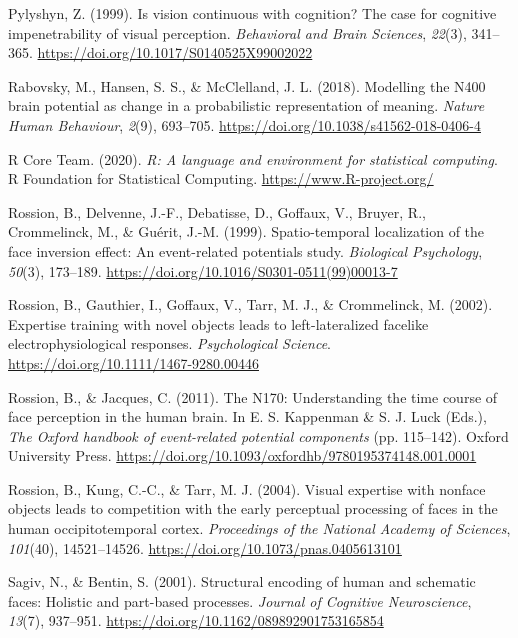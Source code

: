 \documentclass[
  english,
  man,floatsintext]{apa7}
\begin{document}
\leavevmode\hypertarget{ref-pylyshyn1999}{}%
Pylyshyn, Z. (1999). Is vision continuous with cognition? The case for cognitive impenetrability of visual perception. \emph{Behavioral and Brain Sciences}, \emph{22}(3), 341--365. \url{https://doi.org/10.1017/S0140525X99002022}

\leavevmode\hypertarget{ref-rabovsky2018}{}%
Rabovsky, M., Hansen, S. S., \& McClelland, J. L. (2018). Modelling the N400 brain potential as change in a probabilistic representation of meaning. \emph{Nature Human Behaviour}, \emph{2}(9), 693--705. \url{https://doi.org/10.1038/s41562-018-0406-4}

\leavevmode\hypertarget{ref-R-base}{}%
R Core Team. (2020). \emph{R: A language and environment for statistical computing}. R Foundation for Statistical Computing. \url{https://www.R-project.org/}

\leavevmode\hypertarget{ref-rossion1999}{}%
Rossion, B., Delvenne, J.-F., Debatisse, D., Goffaux, V., Bruyer, R., Crommelinck, M., \& Guérit, J.-M. (1999). Spatio-temporal localization of the face inversion effect: An event-related potentials study. \emph{Biological Psychology}, \emph{50}(3), 173--189. \url{https://doi.org/10.1016/S0301-0511(99)00013-7}

\leavevmode\hypertarget{ref-rossion2002}{}%
Rossion, B., Gauthier, I., Goffaux, V., Tarr, M. J., \& Crommelinck, M. (2002). Expertise training with novel objects leads to left-lateralized facelike electrophysiological responses. \emph{Psychological Science}. \url{https://doi.org/10.1111/1467-9280.00446}

\leavevmode\hypertarget{ref-rossion2011}{}%
Rossion, B., \& Jacques, C. (2011). The N170: Understanding the time course of face perception in the human brain. In E. S. Kappenman \& S. J. Luck (Eds.), \emph{The Oxford handbook of event-related potential components} (pp. 115--142). Oxford University Press. \url{https://doi.org/10.1093/oxfordhb/9780195374148.001.0001}

\leavevmode\hypertarget{ref-rossion2004}{}%
Rossion, B., Kung, C.-C., \& Tarr, M. J. (2004). Visual expertise with nonface objects leads to competition with the early perceptual processing of faces in the human occipitotemporal cortex. \emph{Proceedings of the National Academy of Sciences}, \emph{101}(40), 14521--14526. \url{https://doi.org/10.1073/pnas.0405613101}

\leavevmode\hypertarget{ref-sagiv2001}{}%
Sagiv, N., \& Bentin, S. (2001). Structural encoding of human and schematic faces: Holistic and part-based processes. \emph{Journal of Cognitive Neuroscience}, \emph{13}(7), 937--951. \url{https://doi.org/10.1162/089892901753165854}
\end{document}
